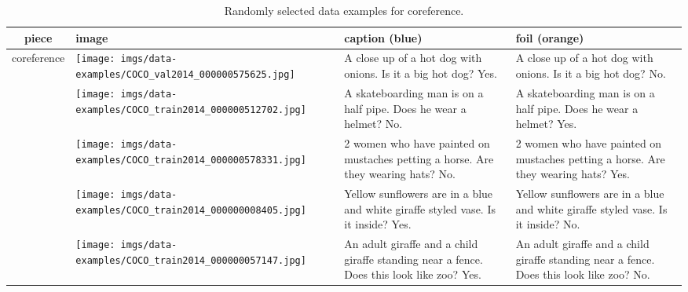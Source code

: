 \documentclass[11pt]{article}
\newcommand{\gr}[1]{\textcolor{niceblue}{#1}}
\newcommand\red[1]{\textcolor{niceorange}{#1}}
\begin{document}
\begin{table*}[t]
    \small
    \centering
    
\begin{tabular}{cp{.28\linewidth}b{.25\linewidth}b{.25\linewidth}}
      \toprule
    \bf piece & \bf image & \bf caption (\gr{blue}) & \bf foil (\red{orange}) \\
    \midrule
    \multirow{5}{*}{coreference} & \texttt{[image: imgs/data-examples/COCO\_val2014\_000000575625.jpg]}
      & A close up of a hot dog with onions. Is it a big hot dog? \gr{Yes}. & A close up of a hot dog with onions. Is it a big hot dog? \red{No}. \\
      \cmidrule{2-4}
      & \texttt{[image: imgs/data-examples/COCO\_train2014\_000000512702.jpg]}
      & A skateboarding man is on a half pipe. Does he wear a helmet? \gr{No}. & A skateboarding man is on a half pipe. Does he wear a helmet? \red{Yes}. \\
      \cmidrule{2-4}
      & \texttt{[image: imgs/data-examples/COCO\_train2014\_000000578331.jpg]}
      & 2 women who have painted on mustaches petting a horse. Are they wearing hats? \gr{No}. & 2 women who have painted on mustaches petting a horse. Are they wearing hats? \red{Yes}. \\
      \cmidrule{2-4}
      & \texttt{[image: imgs/data-examples/COCO\_train2014\_000000008405.jpg]}
      & Yellow sunflowers are in a blue and white giraffe styled vase. Is it inside? \gr{Yes}. & Yellow sunflowers are in a blue and white giraffe styled vase. Is it inside? \red{No}. \\
      \cmidrule{2-4}
    & \texttt{[image: imgs/data-examples/COCO\_train2014\_000000057147.jpg]}
      & An adult giraffe and a child giraffe standing near a fence. Does this look like zoo? \gr{Yes}. & An adult giraffe and a child giraffe standing near a fence. Does this look like zoo? \red{No}. \\
      \bottomrule
    \end{tabular}
\caption{Randomly selected data examples for coreference.}
    \label{tab:coreference-examples}
\end{table*} 
\end{document}
